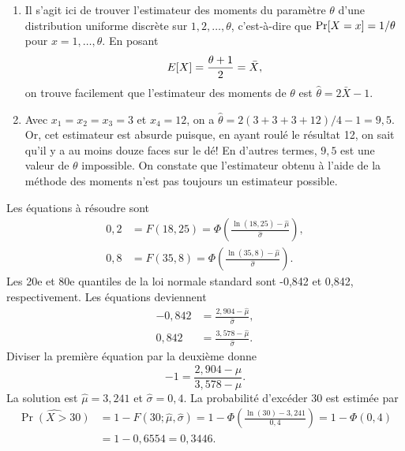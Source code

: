 \begin{solution}{4.4}
    \begin{enumerate}
    \item Il s'agit ici de trouver l'estimateur des moments du
      paramètre $\theta$ d'une distribution uniforme discrète sur $1,
      2, \dots, \theta$, c'est-à-dire que $\mathrm{Pr} [ X = x ] = 1/\theta$
      pour $x = 1, \dots, \theta$. En posant
      \begin{align*}
        E [ X ] = \frac{\theta + 1}{2} = \bar{X},
      \end{align*}
      on trouve facilement que l'estimateur des moments de $\theta$
      est $\hat{\theta} = 2 \bar{X} - 1$.
    \item Avec $x_1 = x_2 = x_3 = 3$ et $x_4 = 12$, on a $\hat{\theta}
      = 2 (3 + 3 + 3 + 12)/4 - 1 = 9,5$. Or, cet estimateur est
      absurde puisque, en ayant roulé le résultat 12, on sait qu'il y a au
      moins douze faces sur le dé! En d'autres termes, $9,5$ est
      une valeur de $\theta$ impossible. On constate que l'estimateur
      obtenu à l'aide de la méthode des moments n'est pas toujours un
      estimateur possible.
    \end{enumerate}
  
\end{solution}
\begin{solution}{4.5}
Les équations à résoudre sont
\begin{align*}
0,2 &= F(18,25) = \Phi\left(\frac{\ln(18,25)-\hat{\mu}}{\hat{\sigma}}\right), \\
0,8 &= F(35,8) = \Phi\left(\frac{\ln(35,8)-\hat{\mu}}{\hat{\sigma}}\right).
\end{align*}
Les 20e et 80e quantiles de la loi normale standard sont -0,842 et 0,842, respectivement. Les équations deviennent
\begin{align*}
-0,842 &= \frac{2,904-\hat{\mu}}{\hat{\sigma}}, \\
0,842 &= \frac{3,578-\hat{\mu}}{\hat{\sigma}}.
\end{align*}
Diviser la première équation par la deuxième donne
$$
-1 = \frac{2,904-\hat{\mu}}{3,578-\hat{\mu}}.
$$
La solution est $\hat{\mu}=3,241$ et $\hat{\sigma}=0,4$. La probabilité d'excéder 30 est estimée par
\begin{align*}
\widehat{\Pr(X>30)} &= 1-F(30; \hat\mu,\hat\sigma) = 1-\Phi\left(\frac{\ln(30)-3,241}{0,4}\right) = 1-\Phi(0,4) \\
&= 1-0,6554 = 0,3446.
\end{align*}
\end{solution}
